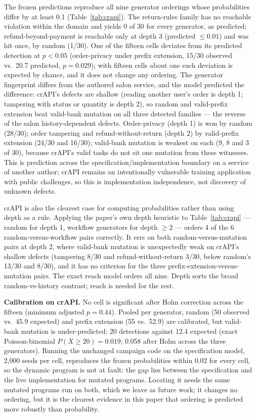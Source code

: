 \documentclass[conference]{IEEEtran}
\begin{document}
The frozen predictions reproduce all nine generator orderings whose probabilities differ
by at least 0.1 (Table~\ref{tab:crapi}). The return-rules family has no reachable violation
within the domain and yields 0 of 30 for every generator, as predicted; refund-beyond-payment
is reachable only at depth 3 (predicted $\le 0.01$) and was hit once, by random (1/30).
One of the fifteen cells deviates from
its predicted detection at $p<0.05$ (order-privacy under prefix extension, 15/30 observed
vs.\ 20.7 predicted, $p=0.029$); with fifteen cells about one such deviation is expected
by chance, and it does not change any ordering. The generator fingerprint differs from the
authored salon service, and the model predicted the difference: crAPI's defects are
shallow (reading another user's order is depth 1; tampering with status or quantity is
depth 2), so random and valid-prefix extension beat valid-bank mutation on all three
detected families --- the reverse of the salon history-dependent defects. Order-privacy
(depth 1) is won by random (28/30); order tampering and refund-without-return (depth 2) by
valid-prefix extension (24/30 and 16/30); valid-bank mutation is weakest on each (9, 8 and
3 of 30), because crAPI's valid tasks do not sit one mutation from these witnesses. This
is prediction across the specification/implementation boundary on a service of another
author; crAPI remains an intentionally vulnerable training application with public
challenges, so this is implementation independence, not discovery of unknown defects.

crAPI is also the clearest case for computing probabilities rather than using depth as a
rule. Applying the paper's own depth heuristic to Table~\ref{tab:crapi} --- random for
depth 1, workflow generators for depth $\ge 2$ --- orders 4 of the 6 random-versus-workflow
pairs correctly. It errs on both random-versus-mutation pairs at depth 2, where valid-bank
mutation is unexpectedly weak on crAPI's shallow defects (tampering 8/30 and
refund-without-return 3/30, below random's 13/30 and 8/30), and it has no criterion for the
three prefix-extension-versus-mutation pairs. The exact reach model orders all nine. Depth
sorts the broad random-vs-history contrast; reach is needed for the rest.

\textbf{Calibration on crAPI.} No cell is significant after Holm correction across the
fifteen (minimum adjusted $p=0.44$). Pooled per generator, random (50 observed vs.\ 45.9
expected) and prefix extension (55 vs.\ 52.9) are calibrated, but valid-bank mutation is
under-predicted: 20 detections against 12.4 expected (exact Poisson-binomial
$P(X\ge20)=0.019$; 0.058 after Holm across the three generators). Running the unchanged
campaign code on the specification model, 2{,}000 seeds per cell, reproduces the frozen
probabilities within 0.02 for every cell, so the dynamic program is not at fault: the gap
lies between the specification and the live implementation for mutated programs. Locating
it needs the same mutated programs run on both, which we leave as future work; it changes
no ordering, but it is the clearest evidence in this paper that ordering is predicted more
robustly than probability.
\end{document}
